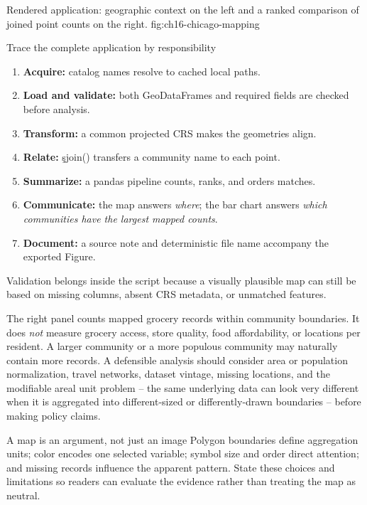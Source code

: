 {Rendered application: geographic context on the left and a ranked comparison of joined point counts on the right.}
{fig:ch16-chicago-mapping}

\begin{SyntaxBox}{Trace the complete application by responsibility}
\begin{enumerate}
    \item \textbf{Acquire:} catalog names resolve to cached local paths.
    \item \textbf{Load and validate:} both GeoDataFrames and required fields are
          checked before analysis.
    \item \textbf{Transform:} a common projected CRS makes the geometries align.
    \item \textbf{Relate:} \c{sjoin()} transfers a community name to each point.
    \item \textbf{Summarize:} a pandas pipeline counts, ranks, and orders matches.
    \item \textbf{Communicate:} the map answers \emph{where}; the bar chart answers
          \emph{which communities have the largest mapped counts}.
    \item \textbf{Document:} a source note and deterministic file name accompany
          the exported Figure.
\end{enumerate}
Validation belongs inside the script because a visually plausible map can still
be based on missing columns, absent CRS metadata, or unmatched features.
\end{SyntaxBox}


The right panel counts mapped grocery records within community boundaries. It
does \emph{not} measure grocery access, store quality, food affordability, or
locations per resident. A larger community or a more populous community may
naturally contain more records. A defensible analysis should consider area or
population normalization, travel networks, dataset vintage, missing locations,
and the modifiable areal unit problem -- the same underlying data can look
very different when it is aggregated into different-sized or
differently-drawn boundaries -- before making policy claims.

\begin{ExplainBox}{A map is an argument, not just an image}
Polygon boundaries define aggregation units; color encodes one selected
variable; symbol size and order direct attention; and missing records influence
the apparent pattern. State these choices and limitations so readers can
evaluate the evidence rather than treating the map as neutral.
\end{ExplainBox}

